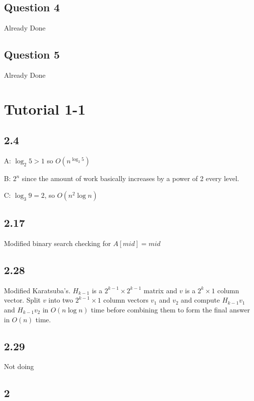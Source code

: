 \documentclass[11pt]{article}
\begin{document}
\subsection{Question 4}

Already Done

\subsection{Question 5}

Already Done

\section{Tutorial 1-1}

\subsection{2.4}

A: $\log_2 5 > 1$ so $O(n^{\log_2 5})$

B: $2^n$ since the amount of work basically increases by a power of 2 every level.

C: $\log_3 9 = 2$, so $O(n^2 \log n)$

\subsection{2.17}

Modified binary search checking for $A[mid] = mid$

\subsection{2.28}

Modified Karatsuba's. $H_{k-1}$ is a $2^{k-1} \times 2^{k - 1}$ matrix and $v$ is a $2^{k} \times 1$ column vector. Split $v$ into two $2^{k-1} \times 1$ column vectors $v_1$ and $v_2$ and compute $H_{k-1}v_1$ and $H_{k-1}v_2$ in $O(n \log n)$ time before combining them to form the final answer in $O(n)$ time.

\subsection{2.29}

Not doing

\subsection{2}
\end{document}
